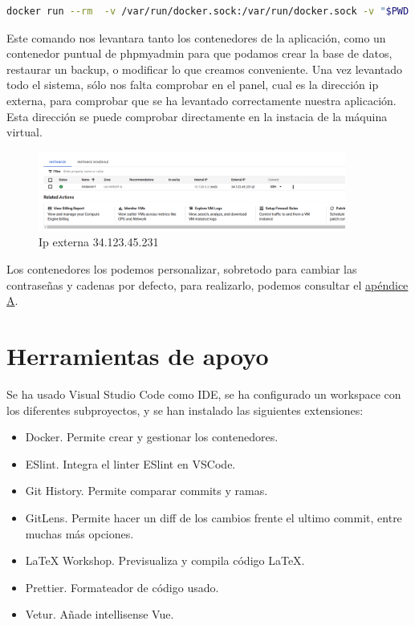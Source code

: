 \documentclass[11pt,spanish,listoffigures,listoftables]{tfgetsinf}
\begin{document}
\begin{lstlisting}[language=bash, caption={comando docker para lanzar docker-compose}]
docker run --rm  -v /var/run/docker.sock:/var/run/docker.sock -v "$PWD:$PWD"   -w="$PWD"  docker/compose:1.24.0 up -d
\end{lstlisting}
Este comando nos levantara tanto los contenedores de la aplicación, como un contenedor puntual de phpmyadmin para que podamos crear la base de datos, restaurar un backup, o modificar lo que creamos conveniente.
Una vez levantado todo el sistema, sólo nos falta comprobar en el panel, cual es la dirección ip externa, para comprobar que se ha levantado correctamente nuestra aplicación. Esta dirección se puede comprobar directamente en la instacia de la máquina virtual.
\begin{figure}[h!] %
  \centering
   \includegraphics[width=0.90\textwidth]{img/ipexterna.png}
   \caption{Ip externa 34.123.45.231}
   \label{fig:cargaweb}
 \end{figure}

Los contenedores los podemos personalizar, sobretodo para cambiar las contraseñas y cadenas por defecto, para realizarlo, podemos consultar el \hyperref[chapter:config]{apéndice A}.

\chapter{Herramientas de apoyo}

Se ha usado Visual Studio Code como IDE, se ha configurado un workspace con los diferentes subproyectos, y se han instalado las siguientes extensiones:
\begin{itemize}
  \item Docker. Permite crear y gestionar los contenedores.
  \item ESlint. Integra el linter ESlint en VSCode.
  \item Git History. Permite comparar commits y ramas.
  \item GitLens. Permite hacer un diff de los cambios frente el ultimo commit, entre muchas más opciones.
  \item LaTeX Workshop. Previsualiza y compila código LaTeX.
  \item Prettier. Formateador de código usado.
  \item Vetur. Añade intellisense Vue.
\end{itemize}
\end{document}
